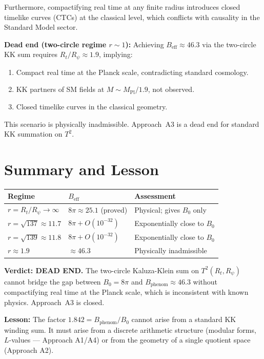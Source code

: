 \documentclass[12pt,a4paper]{article}
\theoremstyle{definition}
\theoremstyle{remark}
\begin{document}
Furthermore, compactifying real time at any finite radius introduces
closed timelike curves (CTCs) at the classical level, which conflicts with
causality in the Standard Model sector.

\begin{deadendbox}
\textbf{Dead end (two-circle regime $r \sim 1$):}
Achieving $B_{\mathrm{eff}} \approx 46.3$ via the two-circle KK sum requires
$R_t/R_\psi \approx 1.9$, implying:
\begin{enumerate}
  \item Compact real time at the Planck scale, contradicting standard cosmology.
  \item KK partners of SM fields at $M \sim M_\mathrm{Pl}/1.9$, not observed.
  \item Closed timelike curves in the classical geometry.
\end{enumerate}
This scenario is physically inadmissible.  Approach~A3 is a dead end for
standard KK summation on $T^2$.
\end{deadendbox}

\section{Summary and Lesson}
\label{sec:summary}

\begin{center}
\begin{tabular}{lll}
  \toprule
  Regime & $B_{\mathrm{eff}}$ & Assessment \\
  \midrule
  $r = R_t/R_\psi \to \infty$ & $8\pi \approx 25.1$ (proved) & Physical; gives $B_0$ only \\
  $r = \sqrt{137} \approx 11.7$ & $8\pi + O(10^{-32})$ & Exponentially close to $B_0$ \\
  $r = \sqrt{139} \approx 11.8$ & $8\pi + O(10^{-32})$ & Exponentially close to $B_0$ \\
  $r \approx 1.9$ & $\approx 46.3$ & Physically inadmissible \\
  \bottomrule
\end{tabular}
\end{center}

\begin{gapbox}
\textbf{Verdict: DEAD END.}
The two-circle Kaluza-Klein sum on $T^2(R_t, R_\psi)$ cannot bridge the gap
between $B_0 = 8\pi$ and $B_{\mathrm{phenom}} \approx 46.3$ without
compactifying real time at the Planck scale, which is inconsistent with known
physics.  Approach~A3 is closed.

\textbf{Lesson:} The factor $1.842 = B_{\mathrm{phenom}}/B_0$ cannot arise
from a standard KK winding sum.  It must arise from a discrete arithmetic
structure (modular forms, $L$-values --- Approach A1/A4) or from the geometry
of a single quotient space (Approach A2).
\end{gapbox}

\ifdefined\INCLUDEMODE
\else
  
\end{document}
